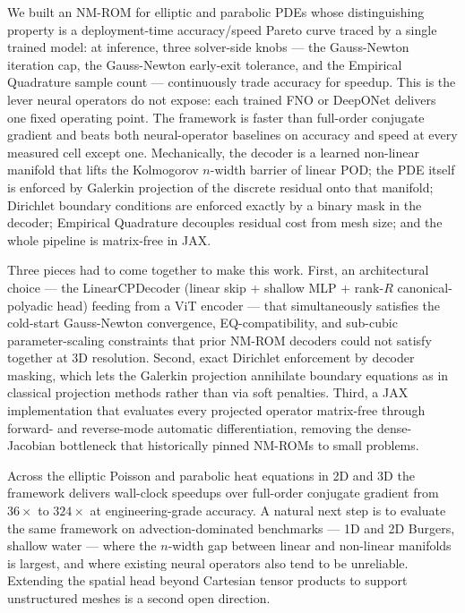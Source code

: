 \documentclass{article}
\begin{document}
We built an NM-ROM for elliptic and parabolic PDEs whose distinguishing
property is a deployment-time accuracy/speed Pareto curve traced by a
single trained model: at inference, three solver-side knobs --- the
Gauss-Newton iteration cap, the Gauss-Newton early-exit tolerance, and
the Empirical Quadrature sample count --- continuously trade accuracy
for speedup. This is the lever neural operators do not expose: each
trained FNO or DeepONet delivers one fixed operating point. The
framework is faster than full-order conjugate gradient and beats both
neural-operator baselines on accuracy and speed at every measured cell
except one. Mechanically, the decoder is a learned non-linear manifold
that lifts the Kolmogorov $n$-width barrier of linear POD; the PDE
itself is enforced by Galerkin projection of the discrete residual onto
that manifold; Dirichlet boundary conditions are enforced exactly by a
binary mask in the decoder; Empirical Quadrature decouples residual
cost from mesh size; and the whole pipeline is matrix-free in JAX.

Three pieces had to come together to make this work. First, an
architectural choice --- the LinearCPDecoder (linear skip + shallow MLP
+ rank-$R$ canonical-polyadic head) feeding from a ViT encoder --- that
simultaneously satisfies the cold-start Gauss-Newton convergence,
EQ-compatibility, and sub-cubic parameter-scaling constraints that
prior NM-ROM decoders could not satisfy together at 3D resolution.
Second, exact Dirichlet enforcement by decoder masking, which lets the
Galerkin projection annihilate boundary equations as in classical
projection methods rather than via soft penalties. Third, a JAX
implementation that evaluates every projected operator matrix-free
through forward- and reverse-mode automatic differentiation, removing
the dense-Jacobian bottleneck that historically pinned NM-ROMs to
small problems.

Across the elliptic Poisson and parabolic heat equations in 2D and 3D
the framework delivers wall-clock speedups over full-order conjugate
gradient from $36\times$ to $324\times$ at engineering-grade accuracy.
A natural next step is to evaluate the same framework on
advection-dominated benchmarks --- 1D and 2D Burgers, shallow water
--- where the $n$-width gap between linear and non-linear manifolds is
largest, and where existing neural operators also tend to be
unreliable. Extending the spatial head beyond Cartesian tensor
products to support unstructured meshes is a second open direction.
\end{document}
